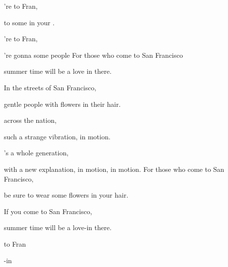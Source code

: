 


\zs
{}'re  to  Fran,

 to  some  in your .

're  to  Fran,

're gonna  some  people 
\ks
\zs
For those who come to San Francisco

summer time will be a love in there.

In the streets of San Francisco,

gentle people with flowers in their hair.
\ks

\zr
{} across the nation,

such a strange vibration,  in motion.

's a whole generation,

with a new explanation,  in motion,  in motion.
\kr
\zs
For those who come to San Francisco,

be sure to wear some flowers in your hair.

If you come to San Francisco,

summer time will be a love-in there.
\ks

\zs
{}   to  Fran

 -in 
\ks
\kp


